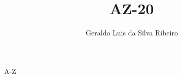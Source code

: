 \documentclass[9pt]{extarticle}
\title{AZ-20}
\author{Geraldo Luis da Silva Ribeiro}
\begin{document}
A-Z


\end{document}
